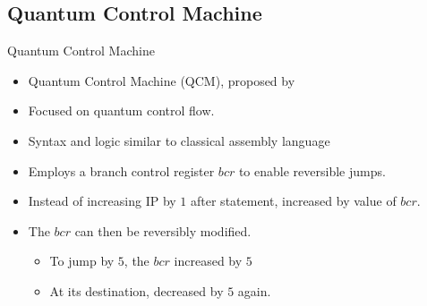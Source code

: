 
\subsection{Quantum Control Machine}
\begin{frame}{Quantum Control Machine}
    \begin{itemize}
        \item Quantum Control Machine (QCM), proposed by \cite{YVC24}
        \item Focused on quantum control flow.
        \item Syntax and logic similar to classical assembly language
        \item Employs a branch control register $bcr$ to enable reversible jumps.
        \item Instead of increasing IP by $1$ after statement, increased by value of $bcr$.
        \item The $bcr$ can then be reversibly modified.
        \begin{itemize}
            \item To jump by $5$, the $bcr$ increased by $5$
            \item At its destination, decreased by $5$ again.
        \end{itemize}
    \end{itemize}
\end{frame}


